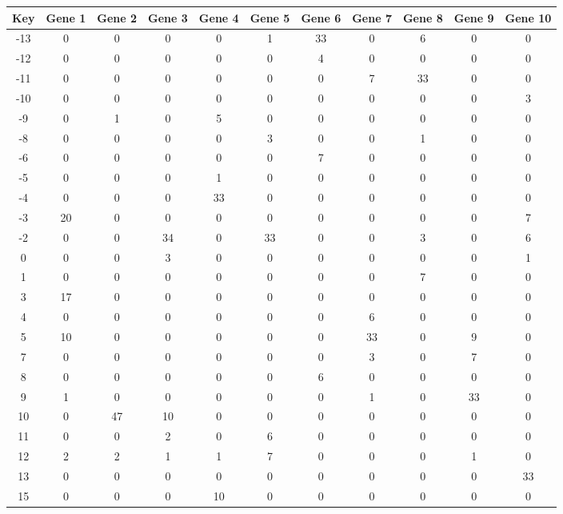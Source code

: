 \begin{tabular}{|c|c|c|c|c|c|c|c|c|c|c|}
\hline
Key & Gene 1 & Gene 2 & Gene 3 & Gene 4 & Gene 5 & Gene 6 & Gene 7 & Gene 8 & Gene 9 & Gene 10 \\
\hline
-13 & 0 & 0 & 0 & 0 & 1 & 33 & 0 & 6 & 0 & 0 \\
-12 & 0 & 0 & 0 & 0 & 0 & 4 & 0 & 0 & 0 & 0 \\
-11 & 0 & 0 & 0 & 0 & 0 & 0 & 7 & 33 & 0 & 0 \\
-10 & 0 & 0 & 0 & 0 & 0 & 0 & 0 & 0 & 0 & 3 \\
-9 & 0 & 1 & 0 & 5 & 0 & 0 & 0 & 0 & 0 & 0 \\
-8 & 0 & 0 & 0 & 0 & 3 & 0 & 0 & 1 & 0 & 0 \\
-6 & 0 & 0 & 0 & 0 & 0 & 7 & 0 & 0 & 0 & 0 \\
-5 & 0 & 0 & 0 & 1 & 0 & 0 & 0 & 0 & 0 & 0 \\
-4 & 0 & 0 & 0 & 33 & 0 & 0 & 0 & 0 & 0 & 0 \\
-3 & 20 & 0 & 0 & 0 & 0 & 0 & 0 & 0 & 0 & 7 \\
-2 & 0 & 0 & 34 & 0 & 33 & 0 & 0 & 3 & 0 & 6 \\
0 & 0 & 0 & 3 & 0 & 0 & 0 & 0 & 0 & 0 & 1 \\
1 & 0 & 0 & 0 & 0 & 0 & 0 & 0 & 7 & 0 & 0 \\
3 & 17 & 0 & 0 & 0 & 0 & 0 & 0 & 0 & 0 & 0 \\
4 & 0 & 0 & 0 & 0 & 0 & 0 & 6 & 0 & 0 & 0 \\
5 & 10 & 0 & 0 & 0 & 0 & 0 & 33 & 0 & 9 & 0 \\
7 & 0 & 0 & 0 & 0 & 0 & 0 & 3 & 0 & 7 & 0 \\
8 & 0 & 0 & 0 & 0 & 0 & 6 & 0 & 0 & 0 & 0 \\
9 & 1 & 0 & 0 & 0 & 0 & 0 & 1 & 0 & 33 & 0 \\
10 & 0 & 47 & 10 & 0 & 0 & 0 & 0 & 0 & 0 & 0 \\
11 & 0 & 0 & 2 & 0 & 6 & 0 & 0 & 0 & 0 & 0 \\
12 & 2 & 2 & 1 & 1 & 7 & 0 & 0 & 0 & 1 & 0 \\
13 & 0 & 0 & 0 & 0 & 0 & 0 & 0 & 0 & 0 & 33 \\
15 & 0 & 0 & 0 & 10 & 0 & 0 & 0 & 0 & 0 & 0 \\
\hline
\end{tabular}